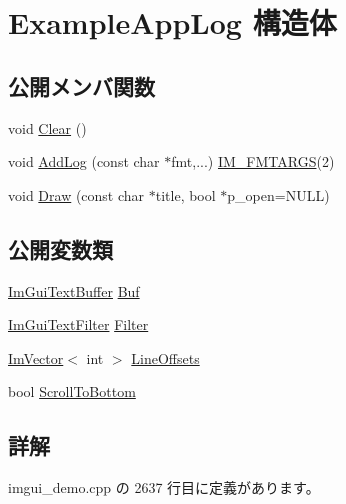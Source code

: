 \hypertarget{struct_example_app_log}{}\section{Example\+App\+Log 構造体}
\label{struct_example_app_log}
\subsection*{公開メンバ関数}
\begin{DoxyCompactItemize}
\item 
void \mbox{\hyperlink{struct_example_app_log_ab9c298defddbb106fdfe4ab16c5eebac}{Clear}} ()
\item 
void \mbox{\hyperlink{struct_example_app_log_afd296fb3b2559acd341fd92883f8f571}{Add\+Log}} (const char $\ast$fmt,...) \mbox{\hyperlink{imgui_8h_a1251c2f9ddac0873dbad8181bd82c9f1}{I\+M\+\_\+\+F\+M\+T\+A\+R\+GS}}(2)
\item 
void \mbox{\hyperlink{struct_example_app_log_a5ad3a4bdb89171b84aeaff96948a1f77}{Draw}} (const char $\ast$title, bool $\ast$p\+\_\+open=N\+U\+LL)
\end{DoxyCompactItemize}
\subsection*{公開変数類}
\begin{DoxyCompactItemize}
\item 
\mbox{\hyperlink{struct_im_gui_text_buffer}{Im\+Gui\+Text\+Buffer}} \mbox{\hyperlink{struct_example_app_log_a74fb7cd7bd8c2507b41331ebb7d0e56d}{Buf}}
\item 
\mbox{\hyperlink{struct_im_gui_text_filter}{Im\+Gui\+Text\+Filter}} \mbox{\hyperlink{struct_example_app_log_a4571947a6000e984ec8da9b7166e1e2b}{Filter}}
\item 
\mbox{\hyperlink{class_im_vector}{Im\+Vector}}$<$ int $>$ \mbox{\hyperlink{struct_example_app_log_af197fca7116f9033a5a5e831ee764ee2}{Line\+Offsets}}
\item 
bool \mbox{\hyperlink{struct_example_app_log_a6834b71563c0595e67b78afb6c7ce39d}{Scroll\+To\+Bottom}}
\end{DoxyCompactItemize}


\subsection{詳解}


 imgui\+\_\+demo.\+cpp の 2637 行目に定義があります。



